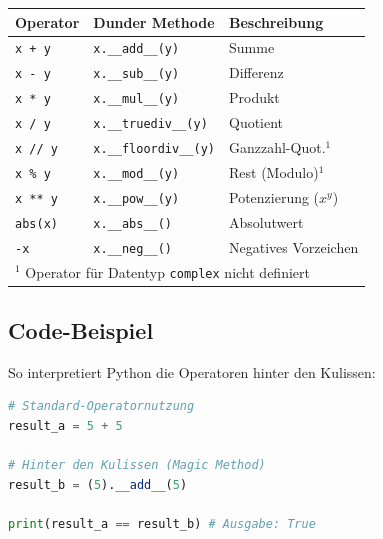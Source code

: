 \begin{center}
    \small
    \begin{tabular}{lll}
    \toprule
    \textbf{Operator} & \textbf{Dunder Methode} & \textbf{Beschreibung} \\ \midrule
    \texttt{x + y} & \texttt{x.\_\_add\_\_(y)} & Summe \\
    \texttt{x - y} & \texttt{x.\_\_sub\_\_(y)} & Differenz \\
    \texttt{x * y} & \texttt{x.\_\_mul\_\_(y)} & Produkt \\
    \texttt{x / y} & \texttt{x.\_\_truediv\_\_(y)} & Quotient \\
    \texttt{x // y} & \texttt{x.\_\_floordiv\_\_(y)} & Ganzzahl-Quot.$^1$ \\
    \texttt{x \% y} & \texttt{x.\_\_mod\_\_(y)} & Rest (Modulo)$^1$ \\
    \texttt{x ** y} & \texttt{x.\_\_pow\_\_(y)} & Potenzierung ($x^y$) \\
    \texttt{abs(x)} & \texttt{x.\_\_abs\_\_()} & Absolutwert \\
    \texttt{-x} & \texttt{x.\_\_neg\_\_()} & Negatives Vorzeichen \\ \midrule
    \multicolumn{3}{l}{\small $^1$ Operator für Datentyp \texttt{complex} nicht definiert} \\ \bottomrule
    \end{tabular}
\end{center}

\subsection*{Code-Beispiel}
So interpretiert Python die Operatoren hinter den Kulissen:

\begin{lstlisting}[language=Python]
# Standard-Operatornutzung
result_a = 5 + 5

# Hinter den Kulissen (Magic Method)
result_b = (5).__add__(5)

print(result_a == result_b) # Ausgabe: True
\end{lstlisting}